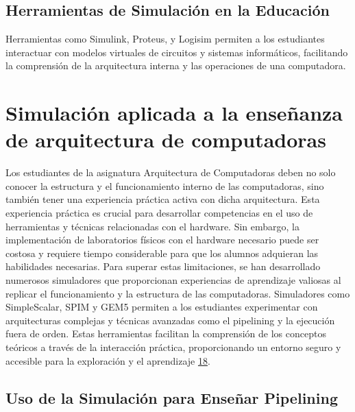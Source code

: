 \documentclass[12pt,twoside]{templates/unerthesis}
\begin{document}
\hypertarget{herramientas-de-simulaciuxf3n-en-la-educaciuxf3n}{%
\subsection{Herramientas de Simulación en la Educación}\label{herramientas-de-simulaciuxf3n-en-la-educaciuxf3n}}

Herramientas como Simulink, Proteus, y Logisim permiten a los estudiantes interactuar con modelos virtuales de circuitos y sistemas informáticos, facilitando la comprensión de la arquitectura interna y las operaciones de una computadora.

\hypertarget{simulaciuxf3n-aplicada-a-la-enseuxf1anza-de-arquitectura-de-computadoras}{%
\section{Simulación aplicada a la enseñanza de arquitectura de computadoras}\label{simulaciuxf3n-aplicada-a-la-enseuxf1anza-de-arquitectura-de-computadoras}}

Los estudiantes de la asignatura Arquitectura de Computadoras deben no solo conocer la estructura y el funcionamiento interno de las computadoras, sino también tener una experiencia práctica activa con dicha arquitectura. Esta experiencia práctica es crucial para desarrollar competencias en el uso de herramientas y técnicas relacionadas con el hardware. Sin embargo, la implementación de laboratorios físicos con el hardware necesario puede ser costosa y requiere tiempo considerable para que los alumnos adquieran las habilidades necesarias.
Para superar estas limitaciones, se han desarrollado numerosos simuladores que proporcionan experiencias de aprendizaje valiosas al replicar el funcionamiento y la estructura de las computadoras. Simuladores como SimpleScalar, SPIM y GEM5 permiten a los estudiantes experimentar con arquitecturas complejas y técnicas avanzadas como el pipelining y la ejecución fuera de orden. Estas herramientas facilitan la comprensión de los conceptos teóricos a través de la interacción práctica, proporcionando un entorno seguro y accesible para la exploración y el aprendizaje \protect\hyperlink{ref-skrien_cpu_2001}{18}.

\hypertarget{uso-de-la-simulaciuxf3n-para-enseuxf1ar-pipelining}{%
\subsection{Uso de la Simulación para Enseñar Pipelining}\label{uso-de-la-simulaciuxf3n-para-enseuxf1ar-pipelining}}
\end{document}
